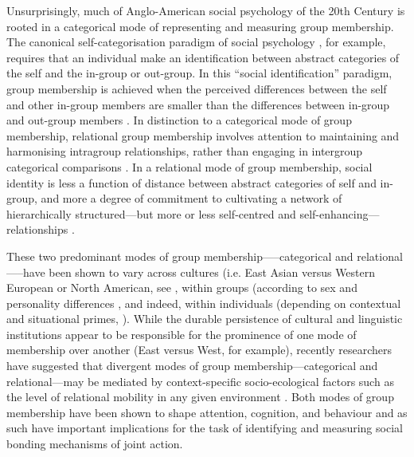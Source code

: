 {  Unsurprisingly, much of Anglo-American social psychology of the 20th Century is rooted in a categorical mode of representing and measuring group membership.  The canonical self-categorisation paradigm of social psychology \citep{Turner1987}, for example, requires that an individual make an identification between abstract categories of the self and the in-group or out-group. In this ``social identification'' paradigm, group membership is achieved when the perceived differences between the self and other in-group members are smaller than the differences between in-group and out-group members \citep{Yuki2014}.  In distinction to a categorical mode of group membership, relational group membership involves attention to maintaining and harmonising intragroup relationships, rather than engaging in intergroup categorical comparisons \citep{Yuki2003}.  In a relational mode of group membership, social identity is less a function of distance between abstract categories of self and in-group, and more a degree of commitment to cultivating a network of hierarchically structured---but more or less self-centred and self-enhancing---relationships \citep{Liu2009,Nisbett2003}.

  These two predominant modes of group membership—--categorical and relational—--have been shown to vary across cultures (i.e. East Asian versus Western European or North American, see \citep{Markus1991,Nisbett2001,Yuki2003}, within groups (according to sex and personality differences \citep{Yuki2014}, and indeed, within individuals (depending on contextual and situational primes, \citep{Lee2014,Wong2005}).  While the durable persistence of cultural and linguistic institutions appear to be responsible for the prominence of one mode of membership over another (East versus West, for example), recently researchers have suggested that divergent modes of group membership—categorical and relational—may be mediated by context-specific socio-ecological factors such as the level of relational mobility in any given environment \citep{Oishi2010,Takagishi2014,Yuki2005}.  Both modes of group membership have been shown to shape attention, cognition, and behaviour \citep{Nisbett2003} and as such have important implications for the task of identifying and measuring social bonding mechanisms of joint action.

}
